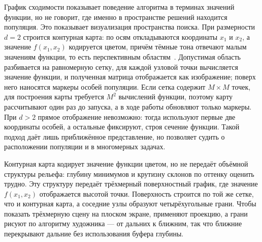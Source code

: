 \documentclass[14pt, a4paper]{extarticle}
\begin{document}
График сходимости показывает поведение алгоритма в терминах значений функции, но
не говорит, где именно в пространстве решений находится популяция. Это показывает
визуализация пространства поиска. При размерности $d = 2$ строится контурная
карта: по осям откладываются координаты $x_1$ и $x_2$, а значение $f(x_1, x_2)$
кодируется цветом, причём тёмные тона отвечают малым значениям функции, то есть
перспективным областям~\cite{novikova2020}. Допустимая область разбивается на
равномерную сетку, для каждой узловой точки вычисляется значение функции, и
полученная матрица отображается как изображение; поверх него наносятся маркеры
особей популяции. Если сетка содержит $M \times M$ точек, для построения карты
требуется $M^2$ вычислений функции, поэтому карту рассчитывают один раз до
запуска, а в ходе работы обновляют только маркеры. При $d > 2$ прямое отображение
невозможно: тогда используют первые две координаты особей, а остальные фиксируют,
строя сечение функции. Такой подход даёт лишь приближённое представление, но
позволяет судить о расположении популяции и в многомерных задачах.

Контурная карта кодирует значение функции цветом, но не передаёт объёмной
структуры рельефа: глубину минимумов и крутизну склонов по оттенку оценить
трудно. Эту структуру передаёт трёхмерный поверхностный график, где значение
$f(x_1, x_2)$ отображается высотой точки. Поверхность строится по той же сетке,
что и контурная карта, а соседние узлы образуют четырёхугольные грани. Чтобы
показать трёхмерную сцену на плоском экране, применяют проекцию, а грани рисуют
по алгоритму художника --- от дальних к ближним, так что ближние перекрывают
дальние без использования буфера глубины.
\end{document}
